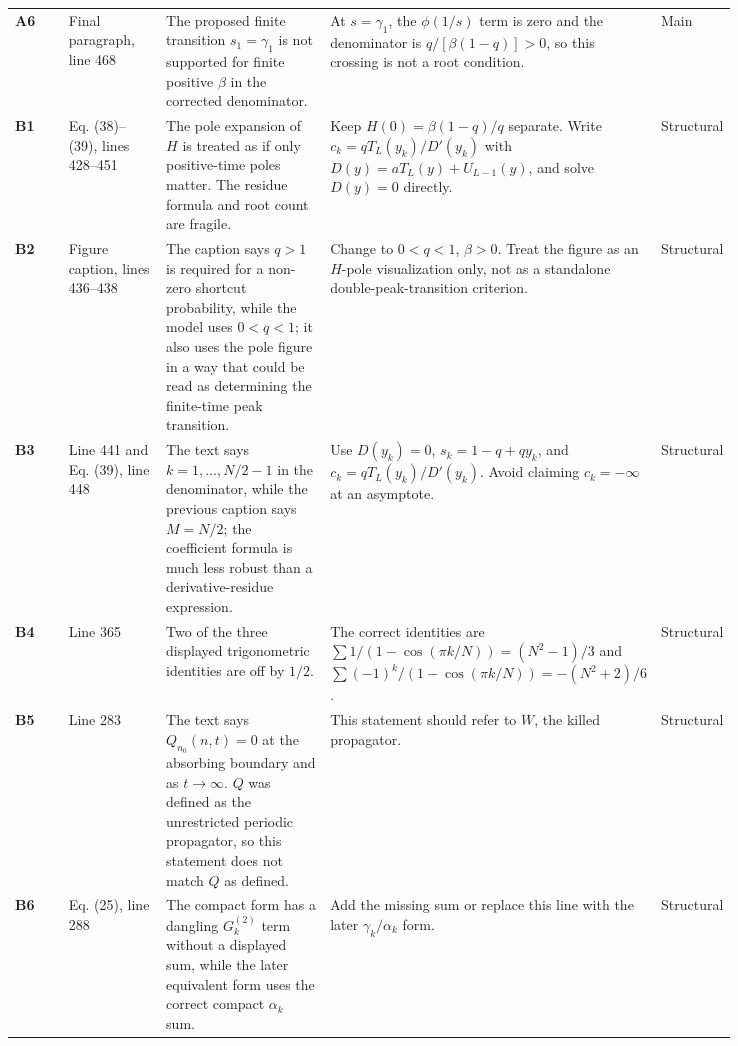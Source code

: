 \documentclass[11pt]{article}
\newcommand{\issue}[1]{\textbf{#1}}
\begin{document}
\begin{longtable}{@{}L{0.08\linewidth}L{0.14\linewidth}L{0.24\linewidth}L{0.28\linewidth}L{0.10\linewidth}@{}}
\issue{A6} & Final paragraph, line 468 &
The proposed finite transition \(s_1=\gamma_1\) is not supported for finite
positive \(\beta\) in the corrected denominator. &
At \(s=\gamma_1\), the \(\phi(1/s)\) term is zero and the denominator is
\(q/[\beta(1-q)]>0\), so this crossing is not a root condition. &
\textcolor{hard}{Main}\\

\issue{B1} & Eq. (38)--(39), lines 428--451 &
The pole expansion of \(H\) is treated as if only positive-time poles matter.
The residue formula and root count are fragile. &
Keep \(H(0)=\beta(1-q)/q\) separate.  Write
\(c_k=qT_L(y_k)/D'(y_k)\) with \(D(y)=aT_L(y)+U_{L-1}(y)\), and solve
\(D(y)=0\) directly. &
\textcolor{struct}{Structural}\\

\issue{B2} & Figure caption, lines 436--438 &
The caption says \(q>1\) is required for a non-zero shortcut probability, while
the model uses \(0<q<1\); it also uses the pole figure in a way that could be
read as determining the finite-time peak transition. &
Change to \(0<q<1\), \(\beta>0\).  Treat the figure as an \(H\)-pole
visualization only, not as a standalone double-peak-transition criterion. &
\textcolor{struct}{Structural}\\

\issue{B3} & Line 441 and Eq. (39), line 448 &
The text says \(k=1,\ldots,N/2-1\) in the denominator, while the previous
caption says \(M=N/2\); the coefficient formula is much less robust than a
derivative-residue expression. &
Use \(D(y_k)=0\), \(s_k=1-q+qy_k\), and
\(c_k=qT_L(y_k)/D'(y_k)\).  Avoid claiming \(c_k=-\infty\) at an asymptote. &
\textcolor{struct}{Structural}\\

\issue{B4} & Line 365 &
Two of the three displayed trigonometric identities are off by \(1/2\). &
The correct identities are
\(\sum 1/(1-\cos(\pi k/N))=(N^2-1)/3\) and
\(\sum (-1)^k/(1-\cos(\pi k/N))=-(N^2+2)/6\). &
\textcolor{struct}{Structural}\\

\issue{B5} & Line 283 &
The text says \(Q_{n_0}(n,t)=0\) at the absorbing boundary and as
\(t\to\infty\).  \(Q\) was defined as the unrestricted periodic propagator, so
this statement does not match \(Q\) as defined. &
This statement should refer to \(W\), the killed propagator. &
\textcolor{struct}{Structural}\\

\issue{B6} & Eq. (25), line 288 &
The compact form has a dangling \(G^{(2)}_k\) term without a displayed sum,
while the later equivalent form uses the correct compact \(\alpha_k\) sum. &
Add the missing sum or replace this line with the later
\(\gamma_k/\alpha_k\) form. &
\textcolor{struct}{Structural}\\


\end{longtable}
\end{document}
